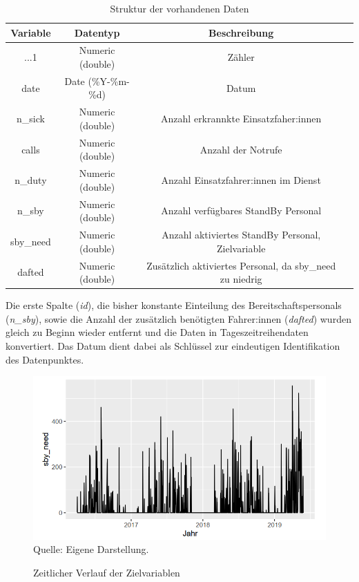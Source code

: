 \begin{table}[h]
\centering
\caption{Struktur der vorhandenen Daten}
\begin{tabular}{|c|c|c|c|}
\hline 
\textbf{Variable} & \textbf{Datentyp} & \textbf{Beschreibung} \\ 
\hline 
...1 & Numeric (double) & Zähler  \\ 
\hline 
date & Date (\%Y-\%m-\%d) & Datum  \\ 
\hline 
n\_sick & Numeric (double) & Anzahl erkrannkte Einsatzfaher:innen  \\ 
\hline 
calls & Numeric (double) & Anzahl der Notrufe  \\ 
\hline 
n\_duty & Numeric (double) & Anzahl Einsatzfahrer:innen im Dienst \\ 
\hline 
n\_sby & Numeric (double) & Anzahl verfügbares StandBy Personal  \\ 
\hline 
\colorbox{hellrot}{sby\_need} & Numeric (double) & Anzahl aktiviertes StandBy Personal, \colorbox{hellrot}{Zielvariable}  \\ 
\hline 
dafted & Numeric (double) & Zusätzlich aktiviertes Personal, da sby\_need zu niedrig  \\ 
\hline 
\end{tabular} 
\label{tab:data}
\end{table}
\FloatBarrier

Die erste Spalte (\textit{id}), die bisher konstante Einteilung des Bereitschaftspersonals (\textit{n\_sby}), sowie die Anzahl der zusätzlich benötigten Fahrer:innen (\textit{dafted}) wurden gleich zu Beginn wieder entfernt und die Daten in Tageszeitreihendaten konvertiert. Das Datum dient dabei als Schlüssel zur eindeutigen Identifikation des Datenpunktes. 

\begin{figure}[h]
\centering
\caption{Zeitlicher Verlauf der Zielvariablen}
\includegraphics[width=15cm]{01_resources/timeplot_sby_need.png}\\
Quelle: Eigene Darstellung.
\label{fig:timeplot}
\end{figure}

